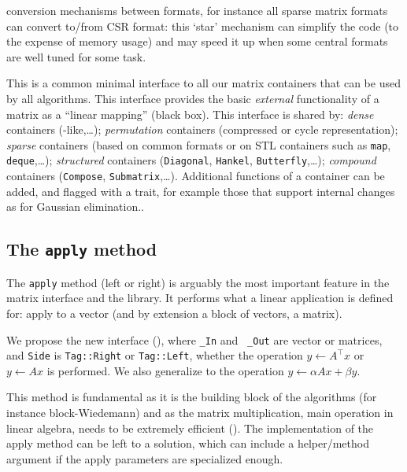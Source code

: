 %
	 conversion mechanisms between formats, for instance all
	 sparse matrix formats can convert to/from CSR format:  this `star'
	 mechanism can simplify the code (to the expense of memory usage) and
	 may speed it up when some central formats  are
	 well tuned for some task.
%
	 \par
%
This is a common minimal interface to all our matrix containers that can be
used by all algorithms.
This interface provides the basic {\em external}
functionality of a matrix as a
 ``linear mapping'' (black box).
This interface is shared by: \emph{dense}
containers (\blas-like,\ldots); \emph{permutation} containers (compressed
 or cycle representation); \emph{sparse} containers (based on
common formats or on STL containers such as {\tt map}, {\tt deque},\ldots);
\emph{structured} containers ({\tt Diagonal}, {\tt Hankel}, {\tt Butterfly},\ldots);
\emph{compound} containers ({\tt Compose}, {\tt Submatrix},\ldots).
Additional functions of a container can be added, and flagged with a trait, for example those that support internal changes as for Gaussian elimination..
%
\subsection{The \texttt{apply} method}\label{ssec:apply}
%
%
\par
%
The \texttt{apply} method (left or right) is arguably the most important
feature in the matrix interface and the \linbox library. It performs what a
linear application is defined for: apply to a vector (and by extension  a block
of vectors, \ie a matrix).
%
\par
%
We propose the new interface (), where {\tt \_In} and {\tt
\_Out} are vector or matrices, and {\tt Side} is {\tt Tag::Right} or
{\tt Tag::Left}, whether the operation $y \gets A^{\top} x$ or  $y \gets A x$ is
performed. We also generalize to the operation $y \gets \alpha A x + \beta y$.
%

%
This method is fundamental as it is the building block of the \applin
algorithms (for instance block-Wiedemann) and as the matrix
multiplication, main operation in linear algebra, needs to be extremely efficient ().
%
%
%
The implementation of the apply method can be left to a \mul solution,
which can include a helper/method argument if the apply
parameters are specialized enough.
%
%
%

